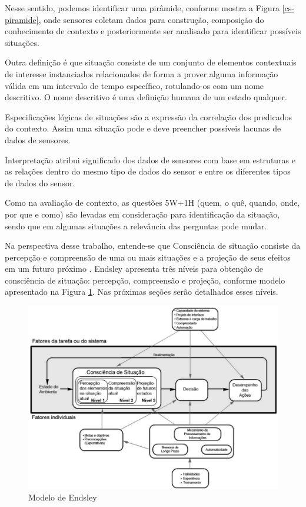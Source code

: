 \documentclass[12pt,a4paper,compsoc]{IEEEtran}
\begin{document}
  Nesse sentido, podemos identificar uma pirâmide, conforme mostra a Figura \ref{cs-piramide},
  onde sensores coletam dados para construção, composição do conhecimento de contexto e
  posteriormente ser analisado para identificar possíveis situações.

  Outra definição é que situação consiste de um conjunto de elementos contextuais de interesse 
  instanciados relacionados de forma a prover alguma informação válida em um intervalo de tempo 
  específico, rotulando-os com um nome descritivo. O nome descritivo é uma definição humana de um 
  estado qualquer.
  
  Especificações lógicas de situações são a expressão da correlação dos predicados do contexto. 
  Assim uma situação pode e deve preencher possíveis lacunas de dados de sensores.
  
  Interpretação atribui significado dos dados de sensores com base em estruturas e as relações 
  dentro do mesmo tipo de dados do sensor e entre os diferentes tipos de dados do sensor.
  
  Como na  avaliação de contexto, as questões 5W+1H (quem, o quê, quando, onde, por que e como) são
  levadas em consideração para identificação da situação, sendo que em algumas situações a 
  relevância das perguntas pode mudar.
  

  Na perspectiva desse trabalho, entende-se que Consciência de situação consiste da percepção e
  compreensão de uma ou mais situações e a projeção de seus efeitos em um futuro próximo 
  \cite{endsley1995}. Endsley apresenta três níveis para obtenção de consciência de situação:
  percepção, compreensão e projeção, conforme modelo apresentado na Figura \ref{modelo-endsley}.
  Nas próximas seções serão detalhados esses níveis.

  \begin{figure}[ht]
    \centerline{\includegraphics[scale=.35]{imagens/modelo-endsley}}
    \caption{Modelo de Endsley \cite{endsley1995}}
    \label{modelo-endsley}
  \end{figure}
\end{document}
